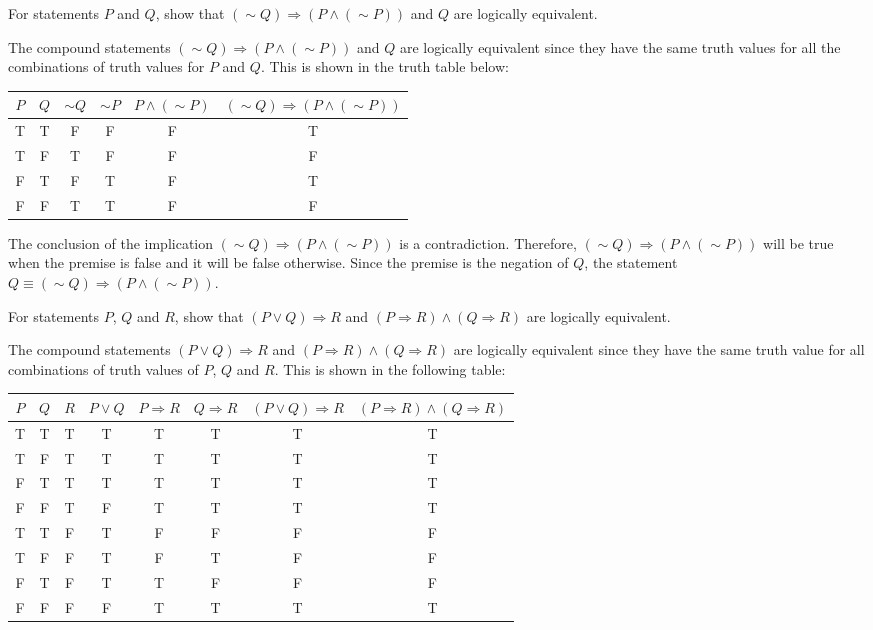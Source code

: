 \documentclass[12pt]{article}
\newenvironment{problem}[2][Problem]{\begin{trivlist}
		\item[\hskip \labelsep {\bfseries #1}\hskip \labelsep {\bfseries #2.}]}{\end{trivlist}}
\newenvironment{solution}[2][Solution]{\begin{trivlist}
		\item[\hskip \labelsep {\bfseries #1}\hskip \labelsep {\bfseries #2.}]}{\end{trivlist}}
\begin{document}
\begin{problem}{54}
	For statements $P$ and $Q$, show that $(\sim Q) \Rightarrow (P \wedge (\sim P))$ and $Q$ are logically equivalent.
	\begin{solution}{}
		The compound statements $(\sim Q) \Rightarrow (P \wedge (\sim P))$ and $Q$ are logically equivalent since they have the same truth values for all the combinations of truth values for $P$ and $Q$. This is shown in the truth table below:
		\begin{center}
			\begin{tabular}{c c c c c c}
				$P$ & $Q$ & $\sim Q$ & $\sim P$ & $P \wedge (\sim P)$ & $(\sim Q) \Rightarrow (P \wedge (\sim P))$\\
				\hline
				T & T & F & F & F & T\\ 
				T & F & T & F & F & F\\
				F & T & F & T & F & T\\
				F & F & T & T & F & F\\
				\hline
			\end{tabular}
		\end{center}
	The conclusion of the implication $(\sim Q) \Rightarrow (P \wedge (\sim P))$ is a contradiction. Therefore, $(\sim Q) \Rightarrow (P \wedge (\sim P))$ will be true when the premise is false and it will be false otherwise. Since the premise is the negation of $Q$, the statement $Q \equiv (\sim Q) \Rightarrow (P \wedge (\sim P))$. 
	\end{solution}
\end{problem}

\begin{problem}{55}
	For statements $P$, $Q$ and $R$,  show that $(P \vee Q) \Rightarrow R$ and $(P \Rightarrow R) \wedge (Q \Rightarrow R)$ are logically equivalent. 
	\begin{solution}{}
		The compound statements $(P \vee Q) \Rightarrow R$ and $(P \Rightarrow R) \wedge (Q \Rightarrow R)$ are logically equivalent since they have the same truth value for all combinations of truth values of $P$, $Q$ and $R$. This is shown in the following table:
		\begin{center}
			\begin{tabular}{c|c|c|c|c|c|c|c}
				$P$ & $Q$ & $R$ & $P \vee Q$ & $P \Rightarrow R$ & $Q \Rightarrow R$ & $(P \vee Q) \Rightarrow R$ & $(P \Rightarrow R) \wedge (Q \Rightarrow R)$\\
				\hline
				T & T & T & T & T & T & T & T\\
				T & F & T & T & T & T & T & T\\
				F & T & T & T & T & T & T & T\\
				F & F & T & F & T & T & T & T\\
				T & T & F & T & F & F & F & F\\
				T & F & F & T & F & T & F & F\\
				F & T & F & T & T & F & F & F\\
				F & F & F & F & T & T & T & T\\
				\hline
			\end{tabular}
		\end{center}
	\end{solution}
\end{problem}
\end{document}
